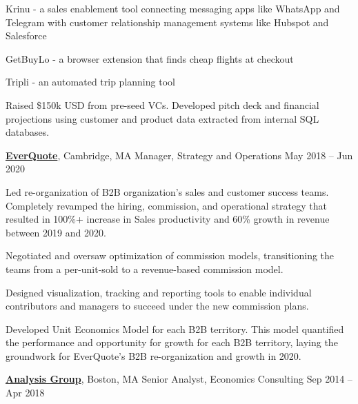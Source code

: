 \documentclass[letterpaper,10pt,oneside]{article}
\begin{document}
\begin{body}
\begin{flushleft}
\vspace{0.3em} \SubBulletItem Krinu - a sales enablement tool connecting messaging apps like WhatsApp and Telegram with customer relationship management systems like Hubspot and Salesforce

\vspace{0.3em} \SubBulletItem GetBuyLo - a browser extension that finds cheap flights at checkout

\vspace{0.3em} \SubBulletItem Tripli - an automated trip planning tool

\vspace{0.3em}
\BulletItem Raised \$150k USD from pre-seed VCs. Developed pitch deck and financial projections using customer and product data extracted from internal SQL databases. 

\end{flushleft}

\href{https://www.everquote.com/}
{\textbf{EverQuote}},
Cambridge, MA
\GapNoBreak
Manager, Strategy and Operations
\hfill
May 2018 -- Jun 2020
\begin{flushleft}


\BulletItem Led re-organization of B2B organization's sales and customer success teams. Completely revamped the hiring, commission, and operational strategy that resulted in 100\%+ increase in Sales productivity and 60\% growth in revenue between 2019 and 2020.

\vspace{0.4em} \SubBulletItem 	Negotiated and oversaw optimization of commission models, transitioning the teams from a per-unit-sold to a revenue-based commission model. 

\vspace{0.4em} \SubBulletItem 	Designed visualization, tracking and reporting tools to enable individual contributors and managers to succeed under the new commission plans. 

\vspace{0.4em} \SubBulletItem 	Developed Unit Economics Model for each B2B territory. This model quantified the performance and opportunity for growth for each B2B territory, laying the groundwork for EverQuote's B2B re-organization and growth in 2020.

\end{flushleft}

\href{https://www.analysisgroup.com/}
{\textbf{Analysis Group}},
Boston, MA
\GapNoBreak
Senior Analyst,
Economics Consulting
\hfill
Sep 2014 --
Apr 2018
\begin{flushleft}


\end{flushleft}
\end{body}
\end{document}
